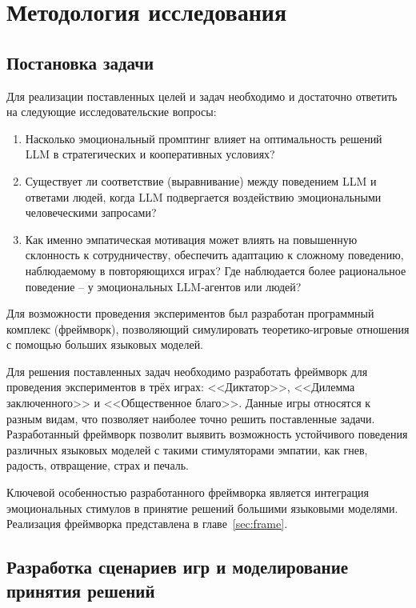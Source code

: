 \chapter{Методология исследования}
\section{Постановка задачи}
Для реализации поставленных целей и задач необходимо и достаточно ответить на следующие исследовательские вопросы:
\begin{enumerate}[label=\arabic*)] %
\item Насколько эмоциональный промптинг влияет на оптимальность решений LLM в стратегических и кооперативных условиях?

\item Существует ли соответствие (выравнивание) между поведением LLM и ответами людей, когда LLM подвергается воздействию эмоциональными человеческими запросами? 

\item Как именно эмпатическая мотивация может влиять на повышенную склонность к сотрудничеству, обеспечить адаптацию к сложному поведению, наблюдаемому в повторяющихся играх? Где наблюдается более рациональное поведение -- у эмоциональных LLM-агентов или людей?
\end{enumerate}

Для возможности проведения экспериментов был разработан программный комплекс (фреймворк), позволяющий симулировать теоретико-игровые отношения с помощью больших языковых моделей.

Для решения поставленных задач необходимо разработать фреймворк для проведения экспериментов в трёх играх: <<Диктатор>>, <<Дилемма заключенного>> и <<Общественное благо>>. Данные игры относятся к разным видам, что позволяет наиболее точно решить поставленные задачи. Разработанный фреймворк позволит выявить возможность устойчивого поведения различных языковых моделей с такими стимуляторами эмпатии, как гнев, радость, отвращение, страх и печаль.

Ключевой особенностью разработанного фреймворка является интеграция эмоциональных стимулов в принятие решений большими языковыми моделями. Реализация фреймворка представлена в главе~\ref{sec:frame}.


\section{Разработка сценариев игр и моделирование принятия решений}

